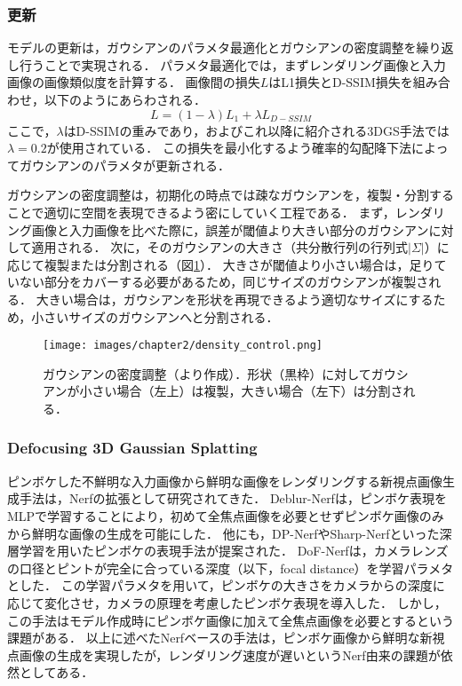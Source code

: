 \subsubsection*{更新}
モデルの更新は，ガウシアンのパラメタ最適化とガウシアンの密度調整を繰り返し行うことで実現される．
パラメタ最適化では，まずレンダリング画像と入力画像の画像類似度を計算する．
画像間の損失$L$はL1損失とD-SSIM損失\cite{d-ssim}を組み合わせ，以下のようにあらわされる．
\begin{equation}
  L = (1 - \lambda)L_1 + {\lambda}L_{D-SSIM}
  \label{eq:l_image}
\end{equation}
ここで，$\lambda$はD-SSIMの重みであり，\cite{3dgs}およびこれ以降に紹介される3DGS手法では$\lambda = 0.2$が使用されている．
この損失を最小化するよう確率的勾配降下法によってガウシアンのパラメタが更新される．\par

ガウシアンの密度調整は，初期化の時点では疎なガウシアンを，複製・分割することで適切に空間を表現できるよう密にしていく工程である．
まず，レンダリング画像と入力画像を比べた際に，誤差が閾値より大きい部分のガウシアンに対して適用される．
次に，そのガウシアンの大きさ（共分散行列の行列式$|\Sigma|$）に応じて複製または分割される（図\ref{fig:density_control}）．
大きさが閾値より小さい場合は，足りていない部分をカバーする必要があるため，同じサイズのガウシアンが複製される．
大きい場合は，ガウシアンを形状を再現できるよう適切なサイズにするため，小さいサイズのガウシアンへと分割される．

\begin{figure}[h]
    \centering
    \texttt{[image: images/chapter2/density\_control.png]}
    \caption[ガウシアンの密度調整]{ガウシアンの密度調整（\cite{3dgs}より作成）．形状（黒枠）に対してガウシアンが小さい場合（左上）は複製，大きい場合（左下）は分割される．}
    \label{fig:density_control}
\end{figure}

\subsubsection{Defocusing 3D Gaussian Splatting}\label{subsec:defocusing_3dgs}
ピンボケした不鮮明な入力画像から鮮明な画像をレンダリングする新視点画像生成手法は，Nerfの拡張として研究されてきた．
Deblur-Nerf\cite{deblur-nerf}は，ピンボケ表現をMLPで学習することにより，初めて全焦点画像を必要とせずピンボケ画像のみから鮮明な画像の生成を可能にした．
他にも，DP-Nerf\cite{dp-nerf}やSharp-Nerf\cite{sharp-nerf}といった深層学習を用いたピンボケの表現手法が提案された．
DoF-Nerf\cite{dof-nerf}は，カメラレンズの口径とピントが完全に合っている深度（以下，focal distance）を学習パラメタとした．
この学習パラメタを用いて，ピンボケの大きさをカメラからの深度に応じて変化させ，カメラの原理を考慮したピンボケ表現を導入した．
しかし，この手法はモデル作成時にピンボケ画像に加えて全焦点画像を必要とするという課題がある．
以上に述べたNerfベースの手法は，ピンボケ画像から鮮明な新視点画像の生成を実現したが，レンダリング速度が遅いというNerf由来の課題が依然としてある．\par

